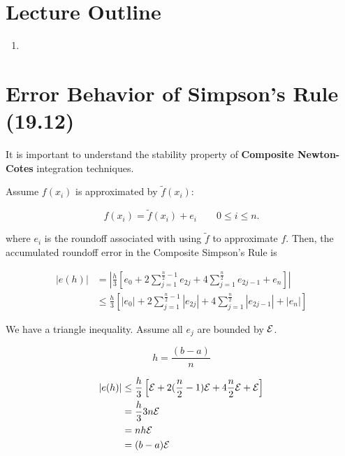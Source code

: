 \section*{Lecture Outline}
\begin{enumerate}
\item 
\end{enumerate}

\section{Error Behavior of Simpson's Rule (19.12)}

It is important to understand the stability property of \textbf{Composite
Newton-Cotes} integration techniques.

Assume $f(x_i)$ is approximated by $\tilde{f}(x_i)$:

\begin{equation*}
  f(x_i) = \tilde{f} (x_i) + e_i \qquad 0 \leq i \leq n
.\end{equation*}

\noindent
where $e_i$ is the roundoff associated with using $\tilde{f}$ to approximate
$f$. Then, the accumulated roundoff error in the Composite Simpson's Rule is

\begin{align*}
  |e(h)| &= \left|\frac{h}{3} \left[
    e_0 + 2 \sum_{j=1}^{\frac{n}{2}-1} e_{2j} + 4 \sum_{j=1}^{\frac{n}{2}}
    e_{2j-1} + e_n
  \right]\right| \\
         & \leq \frac{h}{3} \left[
           |e_0| + 2 \sum_{j=1}^{\frac{n}{2}-1} |e_{2j}| + 4 \sum_{j=1}^{\frac{n}{2}}
           |e_{2j-1}| + |e_n|
         \right]
\end{align*}

We have a triangle inequality. Assume all $e_j$ are bounded by $\mathcal{E}$.

\begin{equation*}
  h = \frac{(b-a)}{n}
\end{equation*}


\begin{align*}
  |e(h)| & \leq \frac{h}{3} \left[
    \mathcal{E} + 2(\frac{n}{2} -1)\mathcal{E} + 4 \frac{n}{2} \mathcal{E} + \mathcal{E}
  \right] \\
         &= \frac{h}{3} 3n \mathcal{E} \\
         &= nh \mathcal{E} \\
         &= (b-a) \mathcal{E} \\
\end{align*}


